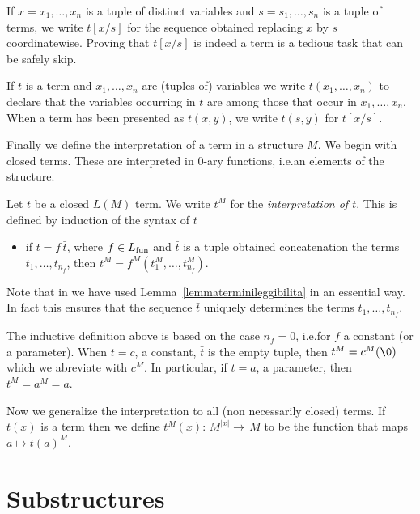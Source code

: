 If $x=x_1,\dots,x_n$ is a tuple of distinct variables and $s=s_1,\dots,s_n$ is a tuple of terms, we write \emph{$t[x/s]$\/} for the sequence obtained replacing $x$ by $s$ coordinatewise. Proving that $t[x/s]$ is indeed a term is a tedious task that can be safely skip.

If $t$ is a term and $x_1,\dots,x_n$ are (tuples of) variables we write \emph{$t(x_1,\dots,x_n)$\/} to declare that the variables occurring in $t$ are among those that occur in $x_1,\dots,x_n$. When a term has been presented as $t(x,y)$, we write \emph{$t(s,y)$\/} for $t[x/s]$.

Finally we define the interpretation of a term in a structure $M$. We begin with closed terms. These are interpreted in $0$-ary functions, i.e.\@ an elements of the structure.

\begin{definition}\label{defterminiinterpretazione}
Let $t$ be a closed $L(M)$ term. We write \emph{$t^M$} for the \emph{interpretation of $t$}. This is defined by induction of the syntax of $t$

\begin{itemize}
\item[i.] if $t=f\,\bar t$, where $f\in L_{\rm fun}$ and $\bar t$ is a tuple obtained concatenation the terms $t_1,\dots,t_{n_f}$, then $t^M=f^M(t^M_1, \dots, t^M_{n_f})$.
\end{itemize}
Note that in  we have used Lemma~\ref{lemmaterminileggibilita} in an essential way. In fact this ensures that the sequence $\bar t$ uniquely determines the terms $t_1, \dots, t_{n_f}$.\QED
\end{definition}

The inductive definition above is based on the case $n_f=0$, i.e.\@ for $f$ a constant (or a parameter).  When $t=c$, a constant, $\bar t$ is the empty tuple, then $t^M=c^M(\0)$ which we abreviate with $c^M$. In particular, if $t=a$, a parameter, then $t^M=a^M=a$.

Now we generalize the interpretation to all (non necessarily closed) terms. If $t(x)$ is a term then we define \emph{$t^M\!(x) :\,M^{|x|}\to\, M$} to be the function that maps $a\mapsto t(a)^M$.

\section{Substructures}
\label{sottostrutture}



